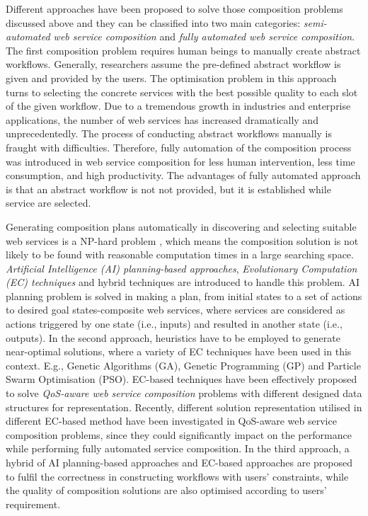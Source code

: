 Different approaches have been proposed to solve those composition problems discussed above and they can be classified into two main categories: \emph{semi-automated web service composition} and \emph{fully automated web service composition}. The first composition problem requires human beings to manually create abstract workflows. Generally, researchers assume the pre-defined abstract workflow is given and provided by the users. The optimisation problem in this approach turns to selecting the concrete services with the best possible quality to each slot of the given workflow. Due to a tremendous growth in industries and enterprise applications, the number of web services has increased dramatically and unprecedentedly. The process of conducting abstract workflows  manually is fraught with difficulties. Therefore, fully automation of the composition process was introduced in web service composition for less human intervention, less time consumption, and high productivity. The advantages of fully automated approach is that an abstract workflow is not not provided, but it is established while service are selected. 


Generating composition plans automatically in discovering and selecting suitable web services is a NP-hard problem \cite{moghaddam2014service}, which means the composition solution is not likely to be found with reasonable computation times in a large searching space. \emph{Artificial Intelligence (AI) planning-based approaches}, \emph{Evolutionary Computation (EC) techniques} and hybrid techniques  are introduced to handle this problem. AI planning problem is solved in making a plan, from initial states to a set of actions to desired goal states-composite web services, where services are considered as actions triggered by one state (i.e., inputs) and resulted in another state (i.e., outputs). In the second approach, heuristics have to be employed to generate near-optimal solutions, where a variety of EC techniques have been used in this context. E.g., Genetic Algorithms (GA), Genetic Programming (GP) and Particle Swarm Optimisation (PSO). EC-based techniques have been effectively proposed to solve \emph{QoS-aware web service composition} problems with different designed data structures for representation. Recently, different solution representation utilised in different EC-based method have been investigated in QoS-aware web service composition problems, since they could significantly impact on the performance while performing fully automated service composition. In the third approach, a hybrid of AI planning-based approaches and EC-based approaches are proposed to fulfil the correctness in constructing workflows with users' constraints, while the quality of composition solutions are also optimised according to users' requirement.

